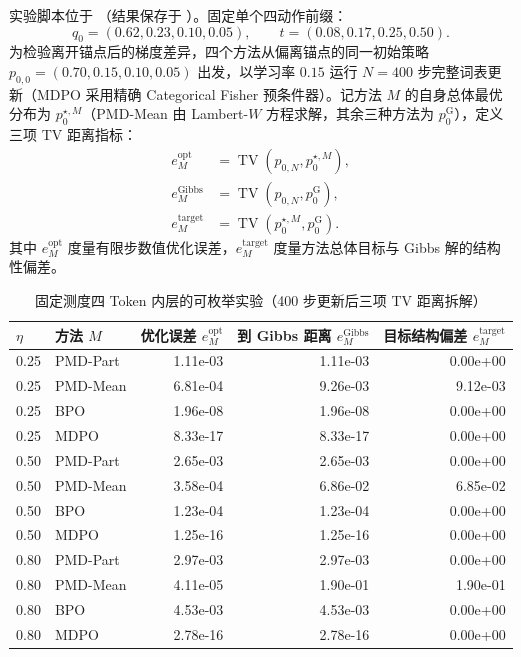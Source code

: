 \documentclass[lang=cn,scheme=chinese,openany]{elegantbook}
\begin{document}
实验脚本位于 （结果保存于 ）。固定单个四动作前缀：
\begin{equation}
 q_0=(0.62,0.23,0.10,0.05),
 \qquad
 t=(0.08,0.17,0.25,0.50).
\end{equation}
为检验离开锚点后的梯度差异，四个方法从偏离锚点的同一初始策略 $p_{0,0}=(0.70,0.15,0.10,0.05)$ 出发，以学习率 $0.15$ 运行 $N=400$ 步完整词表更新（MDPO 采用精确 Categorical Fisher 预条件器）。记方法 $M$ 的自身总体最优分布为 $p_0^{\star,M}$（PMD-Mean 由 Lambert-$W$ 方程求解，其余三种方法为 $p_0^{\mathrm G}$），定义三项 TV 距离指标：
\begin{align*}
e^{\mathrm{opt}}_M&=\operatorname{TV}(p_{0,N},p_0^{\star,M}),\\
e^{\mathrm{Gibbs}}_M&=\operatorname{TV}(p_{0,N},p_0^{\mathrm G}),\\
e^{\mathrm{target}}_M&=\operatorname{TV}(p_0^{\star,M},p_0^{\mathrm G}).
\end{align*}
其中 $e^{\mathrm{opt}}_M$ 度量有限步数值优化误差，$e^{\mathrm{target}}_M$ 度量方法总体目标与 Gibbs 解的结构性偏差。

\begin{table}[ht]
\centering
\caption{固定测度四 Token 内层的可枚举实验（400 步更新后三项 TV 距离拆解）}
\label{tab:toy-results}
\begin{tabular}{llrrr}
\toprule
$\eta$ & 方法 $M$ & 优化误差 $e^{\mathrm{opt}}_M$ & 到 Gibbs 距离 $e^{\mathrm{Gibbs}}_M$ & 目标结构偏差 $e^{\mathrm{target}}_M$\\
\midrule
0.25 & PMD-Part & 1.11e-03 & 1.11e-03 & 0.00e+00\\
0.25 & PMD-Mean & 6.81e-04 & 9.26e-03 & 9.12e-03\\
0.25 & BPO & 1.96e-08 & 1.96e-08 & 0.00e+00\\
0.25 & MDPO & 8.33e-17 & 8.33e-17 & 0.00e+00\\
0.50 & PMD-Part & 2.65e-03 & 2.65e-03 & 0.00e+00\\
0.50 & PMD-Mean & 3.58e-04 & 6.86e-02 & 6.85e-02\\
0.50 & BPO & 1.23e-04 & 1.23e-04 & 0.00e+00\\
0.50 & MDPO & 1.25e-16 & 1.25e-16 & 0.00e+00\\
0.80 & PMD-Part & 2.97e-03 & 2.97e-03 & 0.00e+00\\
0.80 & PMD-Mean & 4.11e-05 & 1.90e-01 & 1.90e-01\\
0.80 & BPO & 4.53e-03 & 4.53e-03 & 0.00e+00\\
0.80 & MDPO & 2.78e-16 & 2.78e-16 & 0.00e+00\\
\bottomrule
\end{tabular}
\end{table}
\end{document}
